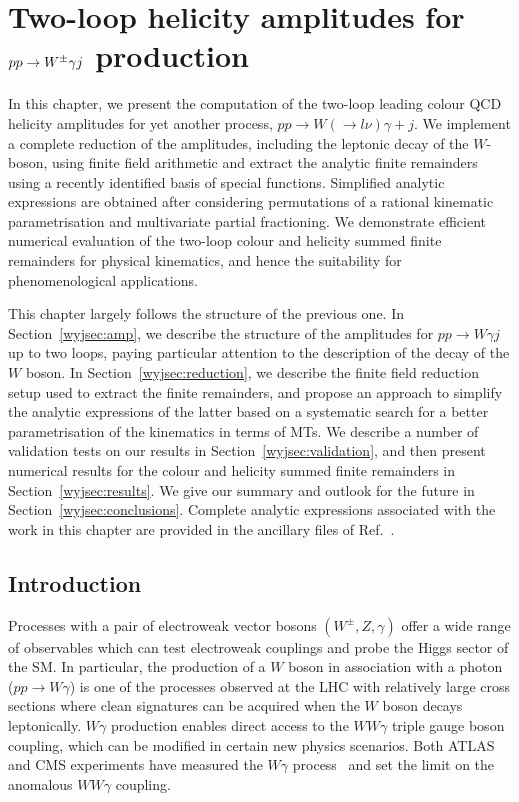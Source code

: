\documentclass[main.tex]{subfiles}
\begin{document}
\chapter[Two-loop helicity amplitudes for $\Wgj$ production]{Two-loop helicity amplitudes for $pp \to W^\pm \gamma j$ production} \label{sec:Wyj}
In this chapter, we present the computation of the two-loop leading colour QCD helicity amplitudes for yet another process, $pp\to W(\to l\nu)\gamma+j$. We implement a complete reduction of the amplitudes, including the leptonic decay of the $W$-boson,
using finite field arithmetic and extract the analytic finite remainders using a recently
identified basis of special functions. Simplified analytic expressions are obtained after considering
permutations of a rational kinematic parametrisation and multivariate partial fractioning. We
demonstrate efficient numerical evaluation of the two-loop colour and helicity summed finite
remainders for physical kinematics, and hence the suitability for phenomenological applications.

This chapter largely follows the structure of the previous one. In Section~\ref{wyjsec:amp}, we describe the structure of the
amplitudes for $pp\to W\gamma j$ up to two loops, paying particular attention to the description of
the decay of the $W$ boson. In Section~\ref{wyjsec:reduction}, we describe the finite field reduction
setup used to extract the finite remainders, and propose an approach to simplify the analytic expressions of the latter based on a systematic search for a better parametrisation of the kinematics in terms of MTs. We describe a number of validation tests on our results in Section~\ref{wyjsec:validation}, and then present numerical results for the
colour and helicity summed finite remainders in Section~\ref{wyjsec:results}. We
give our summary and outlook for the future in Section~\ref{wyjsec:conclusions}. Complete analytic expressions associated with the work in this chapter are provided in the ancillary files of Ref.~\cite{Badger:2022ncb}.

\section{Introduction \label{wyjsec:intro}}
Processes with a pair of electroweak vector bosons $(W^\pm,Z,\gamma)$ offer a wide
range of observables which can test electroweak couplings and probe the Higgs sector of the SM. In particular, the production of a $W$ boson in association with a photon ($pp\to W\gamma$) is
one of the processes observed at the LHC with relatively large cross sections where clean
signatures can be acquired when the $W$ boson decays leptonically. $W\gamma$ production enables direct access to
the $WW\gamma$ triple gauge boson coupling, which can be modified in certain new physics scenarios.
Both ATLAS and CMS experiments have measured the $W\gamma$ process~\cite{CMS:2011myh,ATLAS:2011nmx,ATLAS:2012bpb,ATLAS:2013way,CMS:2013ryd,CMS:2021foa} and set the limit on the
anomalous $WW\gamma$ coupling.
\end{document}
